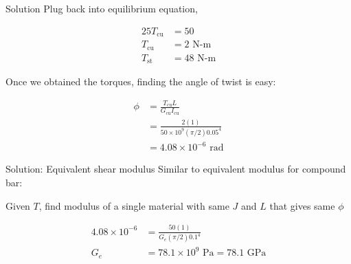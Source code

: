 \documentclass[10pt, svgnames]{beamer}
\begin{document}
\begin{frame}[label={sec:org1f30022}]{Solution}
Plug back into equilibrium equation,

\begin{align*}
    25 T_{\text{cu}} &= 50 \\
    T_{\text{cu}}  &= 2 \text{ N-m} \\
    T_{\text{st}}  &= 48 \text{ N-m}
\end{align*}

Once we obtained the torques, finding the angle of twist is easy:

\begin{align*}
    \phi &= \frac{T_{\text{cu}} L}{G_{\text{cu}}I_{\text{cu}}} \\
         &= \frac{2(1)}{50 \times 10^{9}(\pi/2)0.05^{4}} \\
         &= 4.08 \times 10^{-6} \text{ rad}
\end{align*}
\end{frame}

\begin{frame}[label={sec:org63b23d2}]{Solution: Equivalent shear modulus}
Similar to equivalent modulus for compound bar:

Given \(T\), find modulus of a single material with same \(J\) and \(L\)
that gives same \(\phi\)

\begin{align*}
    4.08 \times 10^{-6} &= \frac{50(1)}{G_{e}(\pi/2)0.1^{4}} \\
    G_{e} &= 78.1 \times 10^{9} \text{ Pa} = 78.1 \text{ GPa}
\end{align*}
\end{frame}
\end{document}
